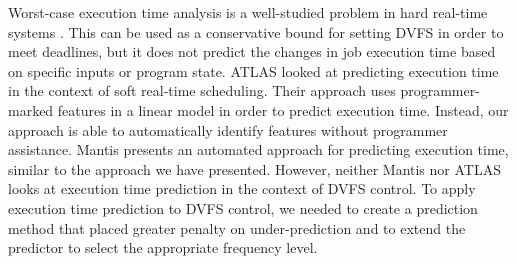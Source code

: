 Worst-case execution time analysis is a well-studied problem in hard real-time
systems \cite{wcetsurvey-tecs08}. 
This can be used as a
conservative bound for setting DVFS in order to meet deadlines, but it does not
predict the changes in job execution time based on specific inputs or program
state.
ATLAS \cite{atlas-rtas13} looked at predicting execution time in the context of
soft real-time scheduling. Their approach uses programmer-marked features in a
linear model in order to predict execution time. Instead, our approach is able
to automatically identify features without programmer assistance.  Mantis
\cite{mantis-atc13} presents an automated approach for predicting execution
time, similar to the approach we have presented. However, neither Mantis nor
ATLAS looks at execution time prediction in the context of DVFS control.
To apply execution time prediction to DVFS control, we needed to create a
prediction method that placed greater penalty on under-prediction and to extend
the predictor to select the appropriate frequency level.
